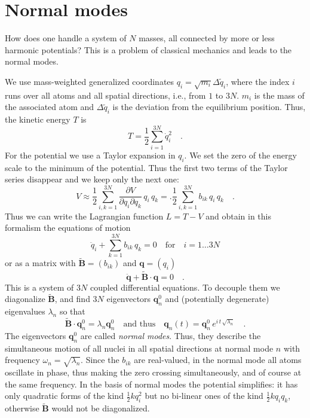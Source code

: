  \section{Normal modes}
 
 How does one handle a system of $N$ masses, all connected by more or less harmonic potentials? This is a problem of classical mechanics and leads to the normal modes.
 
 We use mass-weighted generalized coordinates $q_i = \sqrt{m_i}  \Delta \tilde{q}_i$, where the index $i$ runs over all atoms and all spatial directions, i.e., from $1$ to $3N$. $m_i$ is the mass of the associated atom and $\Delta \tilde{q}_i$ is the deviation from the equilibrium position. Thus, the kinetic energy $T$  is
 \begin{equation}
    T = \frac{1}{2} \sum_{i=1}^{3N} \dot{q}_i^2 \quad .
 \end{equation}
 For the potential we use a Taylor expansion in $q_i$. We set the zero  of the energy scale to the minimum of the potential. Thus the first two terms of the Taylor series disappear and we keep only the next one:
 \begin{equation}
  V \approx \frac{1}{2} \sum_{i,k = 1}^{3N} \frac{\partial V}{\partial q_i \partial q_k} \, q_i \, q_k =. 
   \frac{1}{2} \sum_{i,k = 1}^{3N} b_{ik} \, q_i \, q_k \quad .
 \end{equation}
 Thus we can write the Lagrangian function $L = T - V$ and obtain in this formalism the equations of motion
 \begin{equation}
     \ddot{q}_i + \sum_{k = 1}^{3N} b_{ik} \, q_k = 0 \quad \text{for} \quad i = 1 \dots 3N
 \end{equation}
 or as a matrix with $\tilde{\mathbf{B}} = (b_{ik})$ and $\mathbf{q} = (q_i)$
 \begin{equation}
    \ddot{\mathbf{q}} + \tilde{\mathbf{B}}  \cdot \mathbf{q} = 0 \quad .
 \end{equation}
 This is a system of $3N$ coupled differential equations. To decouple them we diagonalize 
 $\tilde{\mathbf{B}} $, and find $3N$ eigenvectors $\mathbf{q}_n^0$ and (potentially degenerate) eigenvalues $\lambda_n$ so that
 \begin{equation}
       \tilde{\mathbf{B}} \cdot \mathbf{q}_n^0 = \lambda_n \mathbf{q}_n^0 \quad \text{and thus} \quad
        \mathbf{q}_n(t) = \mathbf{q}_n^0 \, e^{i \, t \, \sqrt{\lambda_n}} \quad .
 \end{equation}
 The eigenvectors $\mathbf{q}_n^0$ are called \emph{normal modes}. Thus, they describe the simultaneous motion of all nuclei in all spatial directions at normal mode $n$ with frequency $\omega_n = \sqrt{\lambda_n}$. Since the $b_{ik}$ are real-valued, in the normal mode all atoms oscillate in phase, thus making the zero crossing simultaneously, and of course at the same frequency. In the basis of normal modes the potential simplifies: it has only quadratic forms of the kind $\frac{1}{2} k q_i^2$ but no bi-linear ones of the kind $\frac{1}{2} k q_i q_k$, otherwise $\tilde{\mathbf{B}} $ would not be diagonalized.
 

